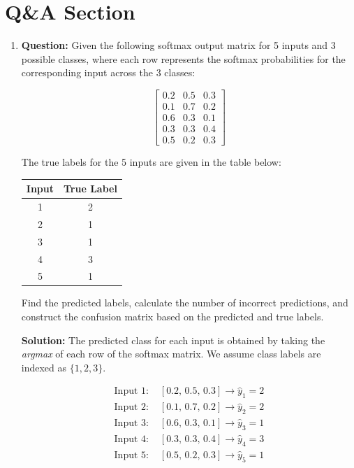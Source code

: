 \documentclass{article}
\begin{document}
\section{Q\&A Section}
\begin{enumerate}
    \item \textbf{Question:}\newline
    Given the following softmax output matrix for 5 inputs and 3 possible classes, where each row represents the softmax probabilities for the corresponding input across the 3 classes:

    \[
    \begin{bmatrix}
    0.2 & 0.5 & 0.3 \\
    0.1 & 0.7 & 0.2 \\
    0.6 & 0.3 & 0.1 \\
    0.3 & 0.3 & 0.4 \\
    0.5 & 0.2 & 0.3
    \end{bmatrix}
    \]

    The true labels for the 5 inputs are given in the table below:

    \begin{center}
    \begin{tabular}{|c|c|}
    \hline
    Input & True Label \\
    \hline
    1 & 2 \\
    2 & 1 \\
    3 & 1 \\
    4 & 3 \\
    5 & 1 \\
    \hline
    \end{tabular}
    \end{center}

    Find the predicted labels, calculate the number of incorrect predictions, and construct the confusion matrix based on the predicted and true labels.

    \textbf{Solution:}\newline
The predicted class for each input is obtained by taking the \textit{argmax} of each row of the softmax matrix. 
We assume class labels are indexed as $\{1,2,3\}$.

\[
\begin{aligned}
\text{Input 1: } & [0.2,\,0.5,\,0.3] \rightarrow \hat{y}_1 = 2 \\
\text{Input 2: } & [0.1,\,0.7,\,0.2] \rightarrow \hat{y}_2 = 2 \\
\text{Input 3: } & [0.6,\,0.3,\,0.1] \rightarrow \hat{y}_3 = 1 \\
\text{Input 4: } & [0.3,\,0.3,\,0.4] \rightarrow \hat{y}_4 = 3 \\
\text{Input 5: } & [0.5,\,0.2,\,0.3] \rightarrow \hat{y}_5 = 1
\end{aligned}
\]


\end{enumerate}
\end{document}

